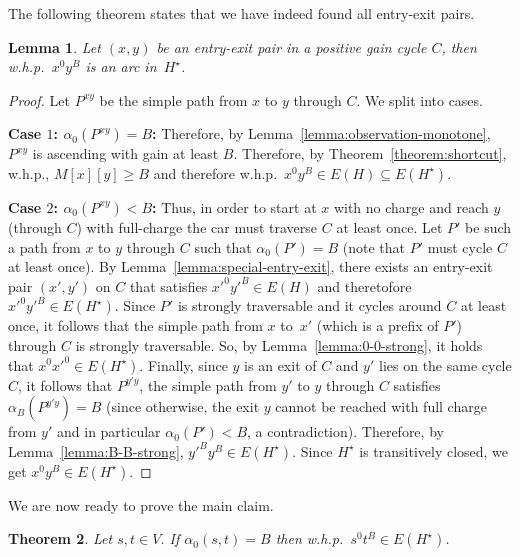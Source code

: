 \documentclass[11pt]{article}
\newtheorem{theorem}{Theorem}[section]
\newtheorem{lemma}[theorem]{Lemma}
\begin{document}
The following theorem states that we have indeed found all entry-exit pairs.
\begin{lemma}\label{lemma:find-entry-exit}
    Let $(x,y)$ be an entry-exit pair in a positive gain cycle $C$, then w.h.p.\ $x^0 y^B$ is an arc in~$H^{\star}$.
\end{lemma}

\begin{proof}
    Let $P^{xy}$ be the simple path from $x$ to $y$ through $C$. We split into cases.

    \textbf{Case $1$: $\alpha_0(P^{xy}) = B$:}
    Therefore, by Lemma~\ref{lemma:observation-monotone}, $P^{xy}$ is ascending with gain at least $B$. Therefore, by Theorem~\ref{theorem:shortcut}, w.h.p., $M[x][y]\ge B$ and therefore w.h.p.\ $x^0 y^B \in E(H) \subseteq E(H^\star)$.
    
    \textbf{Case $2$: $\alpha_0(P^{xy}) < B$:}
    Thus, in order to start at $x$ with no charge and reach $y$ (through $C$) with full-charge the car must traverse $C$ at least once. Let $P'$ be such a path from $x$ to $y$ through $C$ such that $\alpha_0(P')=B$ (note that $P'$ must cycle $C$ at least once).
    By Lemma~\ref{lemma:special-entry-exit}, there exists an entry-exit pair $(x',y')$ on $C$ that satisfies $x'^0 y'^B \in E(H)$ and theretofore $x'^0 y'^B \in E(H^\star)$. Since $P'$ is strongly traversable and it cycles around $C$ at least once, it follows that the simple path from $x$ to~$x'$ (which is a prefix of $P'$) through $C$ is strongly traversable. So, by Lemma~\ref{lemma:0-0-strong}, it holds that $x^0 x'^0 \in E(H^\star)$. 
    Finally, since $y$ is an exit of $C$ and $y'$ lies on the same cycle $C$, it follows that $P^{y'y}$, the simple path from $y'$ to $y$  through $C$ satisfies $\alpha_B(P^{y'y}) = B$ (since otherwise, the exit $y$ cannot be reached with full charge from $y'$ and in particular $\alpha_0(P')<B$, a contradiction). Therefore, by Lemma~\ref{lemma:B-B-strong}, $y'^B y^B \in E(H^\star)$. Since $H^\star$ is transitively closed, we get $x^0 y^B \in E(H^\star)$.
\end{proof}

We are now ready to prove the main claim.

\begin{theorem}\label{theorem:0-B-strong}
    Let $s,t\in V$. If $\alpha_0(s,t) = B$ then w.h.p.\ $s^0 t^B \in E(H^\star)$.
\end{theorem}
\end{document}
